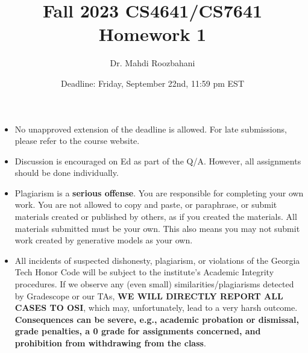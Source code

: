 \documentclass{article}
\title{Fall 2023 CS4641/CS7641 Homework 1}
\author{Dr. Mahdi Roozbahani}
\date{Deadline: Friday, September 22nd, 11:59 pm EST}
\begin{document}
\maketitle
\begin{itemize}
    \item No unapproved extension of the deadline is allowed. For late submissions, please refer to the course website.
    \item Discussion is encouraged on Ed as part of the Q/A. However, all assignments should be done individually.
    \item \color{red}Plagiarism is a \textbf{serious offense}. You are responsible for completing your own work. You are not allowed to copy and paste, or paraphrase, or submit materials created or published by others, as if you created the materials. All materials submitted must be your own. This also means you may not submit work created by generative models as your own.\color{black}
    \item \color{red}All incidents of suspected dishonesty, plagiarism, or violations of the Georgia Tech Honor Code will be subject to the institute’s Academic Integrity procedures. If we observe any (even small) similarities/plagiarisms detected by Gradescope or our TAs, \textbf{WE WILL DIRECTLY REPORT ALL CASES TO OSI}, which may, unfortunately, lead to a very harsh outcome. \textbf{Consequences can be severe, e.g., academic probation or dismissal, grade penalties, a 0 grade for assignments concerned, and prohibition from withdrawing from the class}.
\end{itemize}
\end{document}
